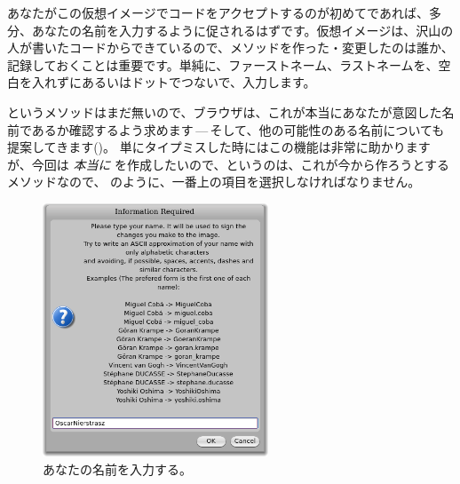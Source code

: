 \documentclass[a4paper,10pt,twoside]{book}
\begin{document}
あなたがこの仮想イメージでコードをアクセプトするのが初めてであれば、多分、あなたの名前を入力するように促されるはずです。仮想イメージは、沢山の人が書いたコードからできているので、メソッドを作った・変更したのは誰か、記録しておくことは重要です。単純に、ファーストネーム、ラストネームを、空白を入れずにあるいはドットでつないで、入力します。


 というメソッドはまだ無いので、ブラウザは、これが本当にあなたが意図した名前であるか確認するよう求めます\,---\,そして、他の可能性のある名前についても提案してきます()。
単にタイプミスした時にはこの機能は非常に助かりますが、今回は \emph{本当に}  を作成したいので、というのは、これが今から作ろうとするメソッドなので、 のように、一番上の項目を選択しなければなりません。



\begin{figure}[htb]
\centerline {\includegraphics[width=0.6\textwidth]{name}}
\caption{あなたの名前を入力する。}
\end{figure}
\end{document}
